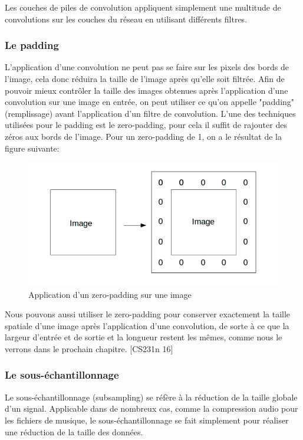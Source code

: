 	Les couches de piles de convolution appliquent simplement une multitude de convolutions sur les couches du réseau en utilisant différents filtres.

\subsubsection{Le padding}

	L'application d'une convolution ne peut pas se faire sur les pixels des bords de l'image, cela donc réduira la taille de l'image après qu'elle soit filtrée. Afin de pouvoir mieux contrôler la taille des images obtenues après l'application d'une convolution sur une image en entrée, on peut utiliser ce qu'on appelle "padding" (remplissage) avant l'application d'un filtre de convolution.
	L'une des techniques utilisées pour le padding est le zero-padding, pour cela il suffit de rajouter des zéros aux bords de l'image. Pour un zero-padding de 1, on a le résultat de la figure suivante:

\begin{figure}[H]
	\centering
		\includegraphics[width=5in]{Figures/zero-padding.png}
	\caption[An Electron]{Application d'un zero-padding sur une image}
	\label{fig:Electron}
\end{figure}

	Nous pouvons aussi utiliser le zero-padding pour conserver exactement la taille spatiale d'une image après l'application d'une convolution, de sorte à ce que la largeur d'entrée et de sortie et la longueur restent les mêmes, comme nous le verrons dans le prochain chapitre. [CS231n 16]


\subsubsection{Le sous-échantillonnage}

	Le sous-échantillonnage (subsampling) se réfère à la réduction de la taille globale d'un signal. Applicable dans de nombreux cas, comme la compression audio pour les fichiers de musique, le sous-échantillonnage se fait simplement pour réaliser une réduction de la taille des données. 

